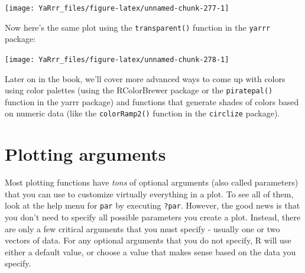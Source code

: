 \documentclass[]{book}
\newenvironment{Shaded}{\begin{snugshade}}{\end{snugshade}}
\newcommand{\KeywordTok}[1]{\textcolor[rgb]{0.13,0.29,0.53}{\textbf{#1}}}
\newcommand{\DataTypeTok}[1]{\textcolor[rgb]{0.13,0.29,0.53}{#1}}
\newcommand{\DecValTok}[1]{\textcolor[rgb]{0.00,0.00,0.81}{#1}}
\newcommand{\StringTok}[1]{\textcolor[rgb]{0.31,0.60,0.02}{#1}}
\newcommand{\CommentTok}[1]{\textcolor[rgb]{0.56,0.35,0.01}{\textit{#1}}}
\newcommand{\OperatorTok}[1]{\textcolor[rgb]{0.81,0.36,0.00}{\textbf{#1}}}
\newcommand{\NormalTok}[1]{#1}
\theoremstyle{definition}
\theoremstyle{definition}
\theoremstyle{remark}
\begin{document}
\begin{center}\texttt{[image: YaRrr\_files/figure-latex/unnamed-chunk-277-1]} \end{center}

Now here's the same plot using the \texttt{transparent()} function in
the \texttt{yarrr} package:

\begin{Shaded}
\end{Shaded}

\begin{center}\texttt{[image: YaRrr\_files/figure-latex/unnamed-chunk-278-1]} \end{center}

Later on in the book, we'll cover more advanced ways to come up with
colors using color palettes (using the RColorBrewer package or the
\texttt{piratepal()} function in the yarrr package) and functions that
generate shades of colors based on numeric data (like the
\texttt{colorRamp2()} function in the \texttt{circlize} package).

\section{Plotting arguments}\label{plotting-arguments}

Most plotting functions have \emph{tons} of optional arguments (also
called parameters) that you can use to customize virtually everything in
a plot. To see all of them, look at the help menu for \texttt{par} by
executing \texttt{?par}. However, the good news is that you don't need
to specify all possible parameters you create a plot. Instead, there are
only a few critical arguments that you must specify - usually one or two
vectors of data. For any optional arguments that you do not specify, R
will use either a default value, or choose a value that makes sense
based on the data you specify.
\end{document}
